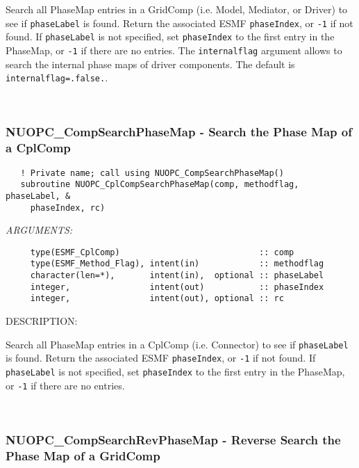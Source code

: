    Search all PhaseMap entries in a GridComp (i.e. Model, Mediator, or Driver)
   to see if {\tt phaseLabel} is found. Return the associated ESMF
   {\tt phaseIndex}, or {\tt -1} if not found. If {\tt phaseLabel} is not
   specified, set {\tt phaseIndex} to the first entry in the PhaseMap, or 
   {\tt -1} if there are no entries. The {\tt internalflag} argument 
   allows to search the internal phase maps of driver components. The default
   is {\tt internalflag=.false.}. 
 
\mbox{}\hrulefill\ 
 
\subsubsection [NUOPC\_CompSearchPhaseMap] {NUOPC\_CompSearchPhaseMap - Search the Phase Map of a CplComp}


\begin{verbatim}   ! Private name; call using NUOPC_CompSearchPhaseMap()
   subroutine NUOPC_CplCompSearchPhaseMap(comp, methodflag, phaseLabel, &
     phaseIndex, rc)\end{verbatim}{\em ARGUMENTS:}
\begin{verbatim}     type(ESMF_CplComp)                            :: comp
     type(ESMF_Method_Flag), intent(in)            :: methodflag
     character(len=*),       intent(in),  optional :: phaseLabel
     integer,                intent(out)           :: phaseIndex
     integer,                intent(out), optional :: rc \end{verbatim}
{\sf DESCRIPTION:\\ }


   Search all PhaseMap entries in a CplComp (i.e. Connector)
   to see if {\tt phaseLabel} is found. Return the associated ESMF
   {\tt phaseIndex}, or {\tt -1} if not found. If {\tt phaseLabel} is not
   specified, set {\tt phaseIndex} to the first entry in the PhaseMap, or 
   {\tt -1} if there are no entries. 
 
\mbox{}\hrulefill\ 
 
\subsubsection [NUOPC\_CompSearchRevPhaseMap] {NUOPC\_CompSearchRevPhaseMap - Reverse Search the Phase Map of a GridComp}


